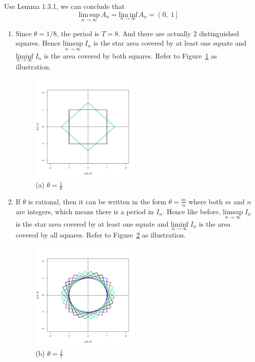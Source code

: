 \begin{list}{1.9.}{}
\item
  Use Lemma 1.3.1, we can conclude that
  \[
    \underset{n\to\infty}{\mathrm{lim\,sup}}\,A_n = \underset{n\to\infty}{\mathrm{lim\,inf}}\,A_n
    = \left(0,\;1\right]
  \]
\item 
  \begin{enumerate}
  \item Since $\theta = 1/8 $, the period is $T=8$. And there are actually 2 distinguished squares. Hence $ \underset{n\to\infty}{\mathrm{limsup}}\;I_n$ is the star area covered by at least one squate and $ \underset{n\to\infty}{\mathrm{liminf}}\;I_n$ is the area covered by both squares. Refer to Figure~\ref{fig:1.9.7.a} as illustration.
    \begin{figure}[htbp]
      \centering
      \includegraphics[width=0.5\textwidth]{./Figures/1_9_7_a.pdf}
      \caption{(a) $\theta = \frac{1}{8}$}
      \label{fig:1.9.7.a}
    \end{figure}

  \item If $\theta$ is rational, then it can be written in the form $\theta = \frac{m}{n}$ where both $m$ and $n$ are integers, which means there is a period in $I_n$. Hence like before, $ \underset{n\to\infty}{\mathrm{limsup}}\;I_n$ is the star area covered by at least one squate and $ \underset{n\to\infty}{\mathrm{liminf}}\;I_n$ is the area covered by all squares. Refer to Figure~\ref{fig:1.9.7.b} as illustration.
    \begin{figure}[htbp]
      \centering
      \includegraphics[width=0.5\textwidth]{./Figures/1_9_7_b.pdf}
      \caption{(b) $\theta = \frac{1}{7}$}
      \label{fig:1.9.7.b}
    \end{figure}
    

\end{enumerate}
\end{list}
